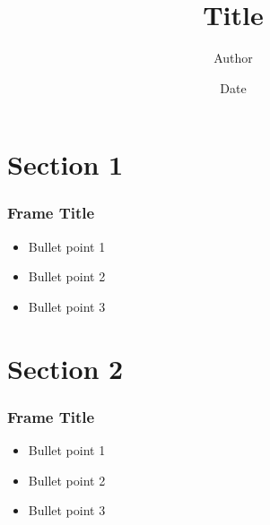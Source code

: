 \documentclass{sde-lecture}
\title{Title}
\author{Author}
\institute{Institute}
\date{Date}
\begin{document}
\frame{\titlepage}

\section{Section 1}

\begin{frame}
\frametitle{Frame Title}
\begin{itemize}
\item Bullet point 1
\item Bullet point 2
\item Bullet point 3
\end{itemize}
\end{frame}

\section{Section 2}

\begin{frame}
\frametitle{Frame Title}
\begin{itemize}
\item Bullet point 1
\item Bullet point 2
\item Bullet point 3
\end{itemize}
\end{frame}
\end{document}
